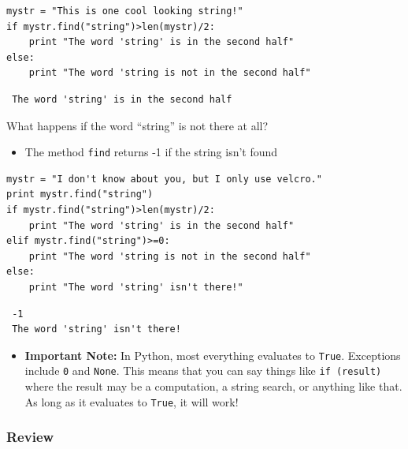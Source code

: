 \documentclass[11pt]{article}
\begin{document}
\begin{verbatim}
mystr = "This is one cool looking string!"
if mystr.find("string")>len(mystr)/2:
    print "The word 'string' is in the second half"
else:
    print "The word 'string is not in the second half"
\end{verbatim}

\begin{verbatim}
 The word 'string' is in the second half
\end{verbatim}

What happens if the word ``string'' is not there at all?

\begin{itemize}
\item The method \texttt{find} returns -1 if the string isn't found
\end{itemize}


\begin{verbatim}
mystr = "I don't know about you, but I only use velcro."
print mystr.find("string")
if mystr.find("string")>len(mystr)/2:
    print "The word 'string' is in the second half"
elif mystr.find("string")>=0:
    print "The word 'string is not in the second half"
else:
    print "The word 'string' isn't there!"
\end{verbatim}

\begin{verbatim}
 -1
 The word 'string' isn't there!
\end{verbatim}

\begin{itemize}
\item \textbf{Important Note:} In Python, most everything evaluates to \texttt{True}.
  Exceptions include \texttt{0} and \texttt{None}.  This means that you can say
  things like \texttt{if (result)} where the result may be a computation, a
  string search, or anything like that.  As long as it evaluates to
  \texttt{True}, it will work!
\end{itemize}
\subsubsection{Review}
\label{sec-2-3-7}
\end{document}
